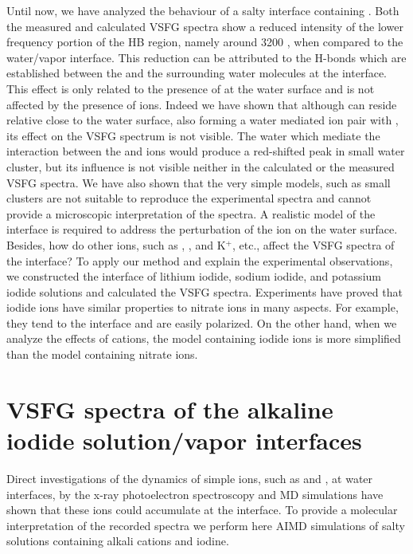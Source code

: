 Until now, we have analyzed the behaviour of a salty interface containing \LiN.
Both the measured and calculated VSFG spectra show a reduced intensity of the lower frequency portion of
the HB region, namely around 3200 \centimeter, when compared to the water/vapor interface. 
This reduction can be attributed to the H-bonds which are established between the \nitrate and the surrounding water molecules at the interface.
This effect is only related to the presence of \nitrate at the water surface and is not affected by the presence of \Li ions.
Indeed we have shown that although \Li can reside relative close to the water surface, also forming a water mediated
ion pair with \nit, its effect on the VSFG spectrum is not visible. The water which mediate the interaction 
between the \nitrate and \Li ions would produce a red-shifted peak in small water cluster, but its influence is not visible 
neither in the calculated or the measured VSFG spectra. We have also shown that the very simple models,
such as small clusters are not suitable to reproduce the experimental spectra and cannot provide a microscopic interpretation of the spectra. 
A realistic model of the interface is required to address the perturbation of the ion on the water surface.
Besides, how do other ions, such as \li, \na, and K$^+$, etc., affect the VSFG spectra of the interface? 
To apply our method and explain the experimental observations, we constructed the interface of lithium iodide,
 sodium iodide, and potassium iodide solutions and calculated the VSFG spectra. 
Experiments have proved that iodide ions have similar properties to nitrate ions in many aspects. 
For example, they tend to the interface and are easily polarized. 
On the other hand, when we analyze the effects of cations, the model containing iodide ions is more simplified than the model containing nitrate ions.

\section{VSFG spectra of the alkaline iodide solution/vapor interfaces}\label{sfg_alkali_iodide_interface} %
Direct investigations of the dynamics of simple ions, such as \I and \br, at water interfaces, 
by the x-ray photoelectron spectroscopy\cite{ghosal2005} and MD simulations\cite{PJ01,PJ02} 
have shown that these ions could accumulate at the interface.
To provide a molecular interpretation of the recorded spectra we perform here AIMD simulations of salty solutions containing alkali cations
and iodine. %

